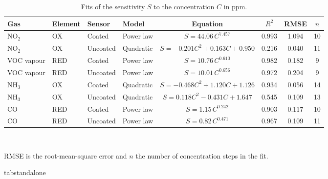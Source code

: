 \documentclass[11pt]{article}
\begin{document}
\setcounter{table}{4}
\fi\fi
\begin{table}[!htbp]
\centering
\caption{Fits of the sensitivity $S$ to the concentration $C$ in ppm.}
\label{tab:fits}
\scriptsize
\setlength{\tabcolsep}{5pt}
\begin{adjustbox}{max width=\textwidth,center}
\begin{tabular}{llllcccc}
\toprule
\textbf{Gas} & \textbf{Element} & \textbf{Sensor} & \textbf{Model} & \textbf{Equation} & \textbf{$R^{2}$} & \textbf{RMSE} & \textbf{$n$} \\
\midrule
NO$_2$ & OX & Coated & Power law & $S=44.06\,C^{7.457}$ & 0.993 & 1.094 & 10 \\
NO$_2$ & OX & Uncoated & Quadratic & $S=-0.201C^2+0.163C+0.950$ & 0.216 & 0.040 & 11 \\
VOC vapour & RED & Coated & Power law & $S=10.76\,C^{0.610}$ & 0.982 & 0.182 & 9 \\
VOC vapour & RED & Uncoated & Power law & $S=10.01\,C^{0.656}$ & 0.972 & 0.204 & 9 \\
NH$_3$ & OX & Coated & Quadratic & $S=-0.468C^2+1.120C+1.126$ & 0.934 & 0.056 & 14 \\
NH$_3$ & OX & Uncoated & Quadratic & $S=0.118C^2-0.431C+1.647$ & 0.545 & 0.109 & 13 \\
CO & RED & Coated & Power law & $S=1.15\,C^{0.242}$ & 0.903 & 0.117 & 10 \\
CO & RED & Uncoated & Power law & $S=0.82\,C^{0.471}$ & 0.967 & 0.109 & 11 \\
\bottomrule
\end{tabular}
\end{adjustbox}
\\[3pt]
\begin{minipage}{0.7\textwidth}
\raggedright\scriptsize RMSE is the root-mean-square error and $n$ the number of concentration steps in the fit.
\end{minipage}
\end{table}
\expandafter\ifx\csname tabstandalone\endcsname\relax\else
\end{document}
